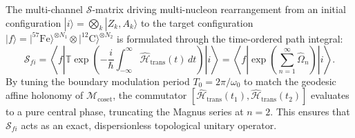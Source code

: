 \documentclass[11pt,onecolumn]{article}
\begin{document}
The multi-channel $\mathcal{S}$-matrix driving multi-nucleon rearrangement from an initial configuration $|i\rangle = \bigotimes_k |Z_k, A_k\rangle$ to the target configuration $|f\rangle = |^{57}\mathrm{Fe}\rangle^{\otimes N_1} \otimes |^{12}\mathrm{C}\rangle^{\otimes N_2}$ is formulated through the time-ordered path integral:
\begin{equation}
\mathcal{S}_{fi} = \left\langle f \left| \mathbb{T} \exp\left( -\frac{i}{\hbar} \int_{-\infty}^\infty \widehat{\mathcal{H}}_{\mathrm{trans}}(t)\,dt \right) \right| i \right\rangle = \left\langle f \left| \exp\left( \sum_{n=1}^\infty \widehat{\Omega}_n \right) \right| i \right\rangle.
\label{eq:s_matrix_magnus}
\end{equation}
By tuning the boundary modulation period $T_0 = 2\pi/\omega_0$ to match the geodesic affine holonomy of $\mathcal{M}_{\mathrm{coset}}$, the commutator $[\widehat{\mathcal{H}}_{\mathrm{trans}}(t_1), \widehat{\mathcal{H}}_{\mathrm{trans}}(t_2)]$ evaluates to a pure central phase, truncating the Magnus series at $n = 2$. This ensures that $\mathcal{S}_{fi}$ acts as an exact, dispersionless topological unitary operator.
\end{document}
